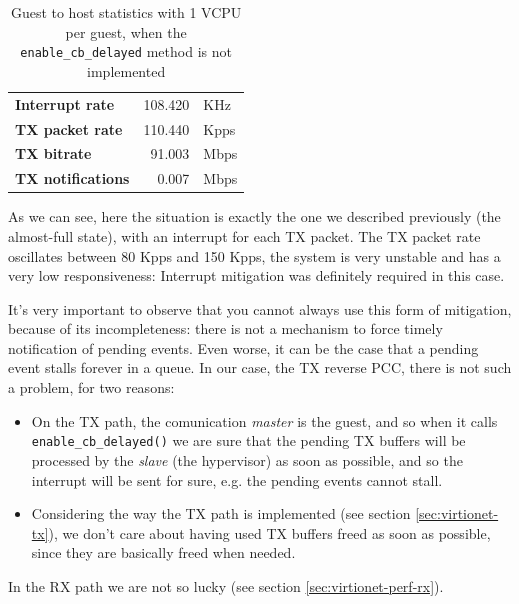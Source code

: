 \begin{table}
\begin{center}
\begin{tabular}{lrl}
\toprule
\textbf{Interrupt rate} & 108.420 & KHz\\
\textbf{TX packet rate} & 110.440 & Kpps\\
\textbf{TX bitrate} & 91.003 & Mbps\\
\textbf{TX notifications} & 0.007 & Mbps\\
\bottomrule
\end{tabular}
\end{center}
\caption{Guest to host statistics with 1 VCPU per guest, when the \texttt{enable\_cb\_delayed} method is not implemented}
\label{tab:virtionet-tx-nomit-g2h1vcpu}
\end{table}

As we can see, here the situation is exactly the one we described previously (the almost-full state), with an interrupt for each TX packet.
The TX packet rate oscillates between 80 Kpps and 150 Kpps, the system is very unstable and has a very low responsiveness: Interrupt
mitigation was definitely required in this case.

\vspace{0.5cm}

It's very important to observe that you cannot always use this form of mitigation, because of its incompleteness: there is not a 
mechanism to force timely notification of pending events. Even worse, it can be the case that a pending event stalls forever in a 
queue.
In our case, the TX reverse PCC, there is not such a problem, for two reasons:
\begin{itemize}
  \item On the TX path, the comunication \emph{master} is the guest, and so when it calls \texttt{enable\_cb\_delayed()} we are sure
	that the pending TX buffers will be processed by the \emph{slave} (the hypervisor) as soon as possible, and so the interrupt
	will be sent for sure, e.g. the pending events cannot stall.
	
  \item Considering the way the TX path is implemented (see section \ref{sec:virtionet-tx}), we don't care about having used TX buffers
	freed as soon as possible, since they are basically freed when needed.
\end{itemize}
In the RX path we are not so lucky (see section \ref{sec:virtionet-perf-rx}).

\vspace{0.5cm}

